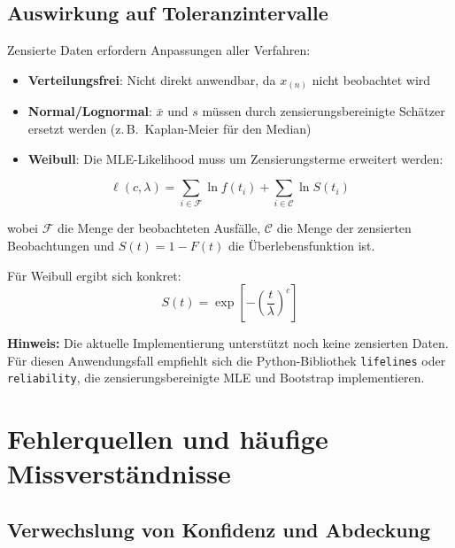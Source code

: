 \documentclass[10pt,a4paper,twocolumn]{article}
\theoremstyle{definition}
\newcommand{\hinweis}[1]{%
    \begin{center}
    \colorbox{noteblue}{\parbox{0.92\linewidth}{\small\textbf{Hinweis:} #1}}
    \end{center}
}
\newcommand{\xbar}{\bar{x}}
\begin{document}
\subsection{Auswirkung auf Toleranzintervalle}

Zensierte Daten erfordern Anpassungen aller Verfahren:
\begin{itemize}[nosep,leftmargin=*]
    \item \textbf{Verteilungsfrei}: Nicht direkt anwendbar,
          da $x_{(n)}$ nicht beobachtet wird
    \item \textbf{Normal/Lognormal}: $\xbar$ und $s$ müssen
          durch zensierungsbereinigte Schätzer ersetzt werden
          (z.\,B.\ Kaplan-Meier für den Median)
    \item \textbf{Weibull}: Die MLE-Likelihood muss um
          Zensierungsterme erweitert werden:
\end{itemize}

\begin{equation}
    \ell(c, \lambda) = \sum_{i \in \mathcal{F}} \ln f(t_i)
    + \sum_{i \in \mathcal{C}} \ln S(t_i)
    \label{eq:censored_lik}
\end{equation}

wobei $\mathcal{F}$ die Menge der beobachteten Ausfälle,
$\mathcal{C}$ die Menge der zensierten Beobachtungen und
$S(t) = 1 - F(t)$ die Überlebensfunktion ist.

Für Weibull ergibt sich konkret:
\begin{equation}
    S(t) = \exp\!\left[-\left(\frac{t}{\lambda}\right)^c\right]
\end{equation}

\hinweis{Die aktuelle Implementierung unterstützt noch keine
zensierten Daten. Für diesen Anwendungsfall empfiehlt sich die
Python-Bibliothek \texttt{lifelines} oder \texttt{reliability},
die zensierungsbereinigte MLE und Bootstrap implementieren.}


\section{Fehlerquellen und häufige Missverständnisse}
\label{sec:fehler}

\subsection{Verwechslung von Konfidenz und Abdeckung}
\end{document}
